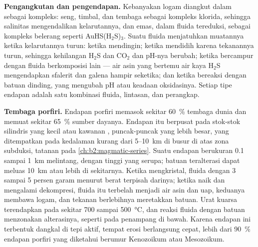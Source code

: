 \textbf{Pengangkutan dan pengendapan.} Kebanyakan logam diangkut dalam  sebagai kompleks:
seng, timbal, dan tembaga sebagai kompleks klorida, sehingga salinitas mengendalikan kelarutannya, dan emas,
dalam fluida tereduksi, sebagai kompleks belerang seperti AuHS(H$_2$S)$_3$. Suatu fluida menjatuhkan muatannya ketika
kelarutannya turun: ketika mendingin; ketika mendidih karena tekanannya turun, sehingga kehilangan H$_2$S dan CO$_2$ dan
pH-nya berubah; ketika bercampur dengan fluida berkomposisi lain --- air asin yang bertemu air kaya
H$_2$S mengendapkan sfalerit dan galena hampir seketika; dan ketika bereaksi dengan batuan
dinding, yang mengubah pH atau keadaan oksidasinya. Setiap tipe endapan adalah satu kombinasi fluida,
lintasan, dan perangkap.

\textbf{Tembaga porfiri.} Endapan porfiri memasok sekitar \qty{60}{\percent} tembaga dunia
dan memuat sekitar \qty{65}{\percent} sumber dayanya. Endapan itu berpusat pada stok-stok silindris yang kecil
atau kawanan , puncak-puncak  yang lebih besar, yang ditempatkan pada kedalaman kurang dari 5--\qty{10}{km} di
busur di atas zona subduksi, tatanan pada \cref{ch:b2:magmatic-series}. Suatu endapan berukuran 0.1 sampai
\qty{1}{km} melintang, dengan tinggi yang serupa; batuan teralterasi dapat meluas \qty{10}{km} atau lebih di sekitarnya.
Ketika  mengkristal, fluida dengan 3 sampai 5 persen garam menurut berat terpisah darinya; ketika naik dan
mengalami dekompresi, fluida itu terbelah menjadi air asin dan uap, keduanya membawa logam, dan tekanan berlebihnya
meretakkan batuan. Urat kuarsa terendapkan pada sekitar 700 sampai \qty{500}{\celsius}, dan
reaksi fluida dengan batuan menzonakan alterasinya, seperti pada penampang di bawah. Karena
endapan ini terbentuk dangkal di tepi aktif, tempat erosi berlangsung cepat, lebih dari \qty{90}{\percent} endapan porfiri
yang diketahui berumur Kenozoikum atau Mesozoikum.

